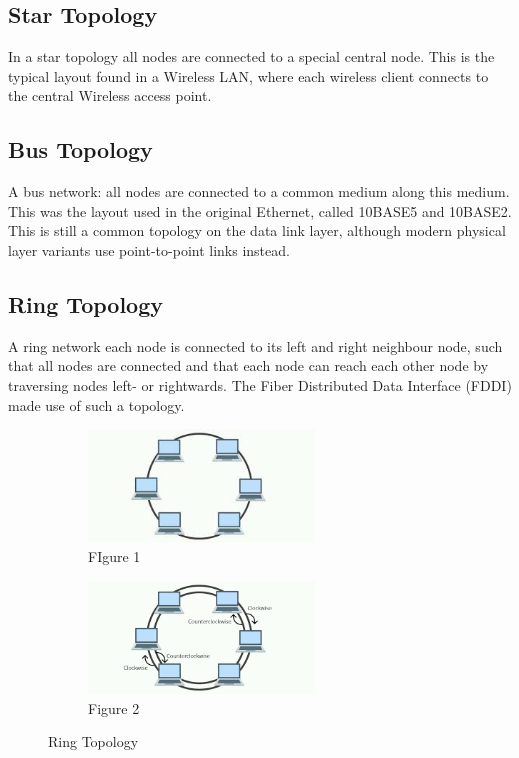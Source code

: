 \documentclass{article}
\begin{document}
\subsection{Star Topology}
In a star topology all nodes are connected to a special central node. This is the typical layout found in a Wireless LAN, where each wireless client connects to the central Wireless access point.\\
\subsection{Bus Topology}
A bus network: all nodes are connected to a common medium along this medium. This was the layout used in the original Ethernet, called 10BASE5 and 10BASE2. This is still a common topology on the data link layer, although modern physical layer variants use point-to-point links instead.
\subsection{Ring Topology}
A ring network each node is connected to its left and right neighbour node, such that all nodes are connected and that each node can reach each other node by traversing nodes left- or rightwards. The Fiber Distributed Data Interface (FDDI) made use of such a topology.
\begin{figure}[h]
\begin{subfigure}{0.5\textwidth}
\includegraphics[width=0.9\linewidth, height=3cm]{ring.jpg}
\caption*{FIgure 1}
\end{subfigure}
\begin{subfigure}{0.5\textwidth}
\includegraphics[width=0.9\linewidth, height=3cm]{ring2.jpg}
\caption*{Figure 2}
\end{subfigure}
\caption*{Ring Topology}
\end{figure}
\end{document}
